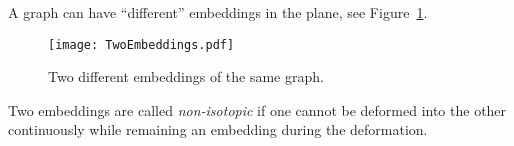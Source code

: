 

\setcounter{section}{3}
\setcounter{subsection}{1}
\setcounter{dfn}{1}


A graph can have ``different'' embeddings in the plane, see Figure~\ref{fig:TwoEmbeddings}.

\begin{figure}[ht]
\begin{center}
\texttt{[image: TwoEmbeddings.pdf]}
\end{center}
\caption{Two different embeddings of the same graph.}
\label{fig:TwoEmbeddings}
\end{figure}

Two embeddings are called \emph{non-isotopic} if one cannot be deformed into the other continuously
while remaining an embedding during the deformation.



